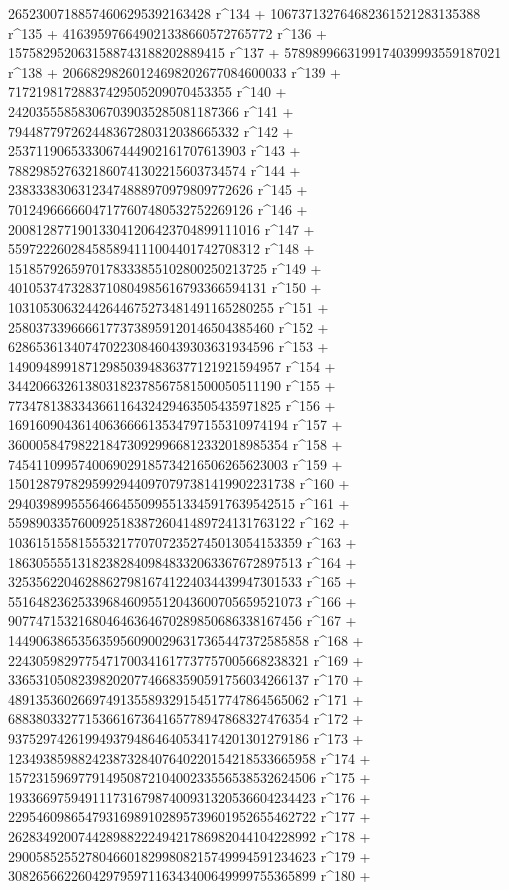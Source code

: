        26523007188574606295392163428 r^134 + 
       106737132764682361521283135388 r^135 + 
       416395976649021338660572765772 r^136 + 
       1575829520631588743188202889415 r^137 + 
       5789899663199174039993559187021 r^138 + 
       20668298260124698202677084600033 r^139 + 
       71721981728837429505209070453355 r^140 + 
       242035558583067039035285081187366 r^141 + 
       794487797262448367280312038665332 r^142 + 
       2537119065333067444902161707613903 r^143 + 
       7882985276321860741302215603734574 r^144 + 
       23833383063123474888970979809772626 r^145 + 
       70124966666047177607480532752269126 r^146 + 
       200812877190133041206423704899111016 r^147 + 
       559722260284585894111004401742708312 r^148 + 
       1518579265970178333855102800250213725 r^149 + 
       4010537473283710804985616793366594131 r^150 + 
       10310530632442644675273481491165280255 r^151 + 
       25803733966661773738959120146504385460 r^152 + 
       62865361340747022308460439303631934596 r^153 + 
       149094899187129850394836377121921594957 r^154 + 
       344206632613803182378567581500050511190 r^155 + 
       773478138334366116432429463505435971825 r^156 + 
       1691609043614063666613534797155310974194 r^157 + 
       3600058479822184730929966812332018985354 r^158 + 
       7454110995740069029185734216506265623003 r^159 + 
       15012879782959929440970797381419902231738 r^160 + 
       29403989955564664550995513345917639542515 r^161 + 
       55989033576009251838726041489724131763122 r^162 + 
       103615155815553217707072352745013054153359 r^163 + 
       186305555131823828409848332063367672897513 r^164 + 
       325356220462886279816741224034439947301533 r^165 + 
       551648236253396846095512043600705659521073 r^166 + 
       907747153216804646364670289850686338167456 r^167 + 
       1449063865356359560900296317365447372585858 r^168 + 
       2243059829775471700341617737757005668238321 r^169 + 
       3365310508239820207746683590591756034266137 r^170 + 
       4891353602669749135589329154517747864565062 r^171 + 
       6883803327715366167364165778947868327476354 r^172 + 
       9375297426199493794864640534174201301279186 r^173 + 
       12349385988242387328407640220154218533665958 r^174 + 
       15723159697791495087210400233556538532624506 r^175 + 
       19336697594911173167987400931320536604234423 r^176 + 
       22954609865479316989102895739601952655462722 r^177 + 
       26283492007442898822249421786982044104228992 r^178 + 
       29005852552780466018299808215749994591234623 r^179 + 
       30826566226042979597116343400649999755365899 r^180 + 
